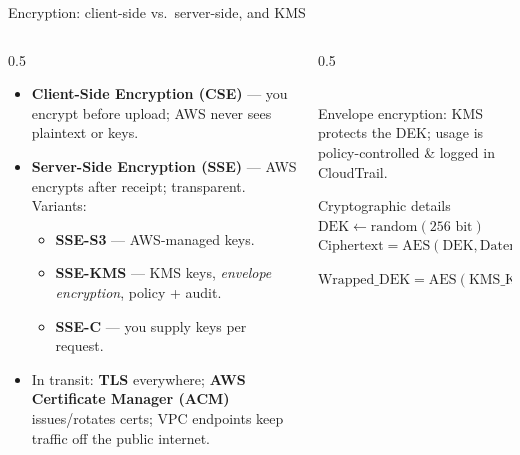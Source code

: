 \documentclass[aspectratio=169,10pt]{beamer}
\newcommand{\svc}[1]{{\color{accent}\textsf{\textbf{#1}}}}      %
\newcommand{\term}[1]{{\color{awsink}\textbf{#1}}}
\begin{document}
\begin{frame}{Encryption: client-side vs.\ server-side, and KMS}
  \begin{columns}[T]
    \begin{column}{0.5\textwidth}\small
      \begin{itemize}
        \item \term{Client-Side Encryption (CSE)} --- you encrypt before upload; AWS never sees plaintext or keys.
        \item \term{Server-Side Encryption (SSE)} --- AWS encrypts after receipt; transparent. Variants:
          \begin{itemize}
            \item \term{SSE-S3} --- AWS-managed keys.
            \item \term{SSE-KMS} --- KMS keys, \emph{envelope encryption}, policy + audit.
            \item \term{SSE-C} --- you supply keys per request.
          \end{itemize}
        \item In transit: \term{TLS} everywhere; \svc{AWS Certificate Manager (ACM)} issues/rotates certs; VPC endpoints
              keep traffic off the public internet.
      \end{itemize}
    \end{column}
    \begin{column}{0.5\textwidth}
      \centering
      \\[0.3em]
      {\scriptsize Envelope encryption: KMS protects the DEK; usage is policy-controlled \& logged in CloudTrail.}
    \begin{block}{Cryptographic details}
      $\text{DEK} \leftarrow \text{random}(256 \text{ bit})$ 
    $\text{Ciphertext} = \text{AES}(\text{DEK}, \text{Daten})$ 

    $\text{Wrapped\_DEK} = \text{AES}(\text{KMS\_Key}, \text{DEK})$ 
    \end{block}
      
    \end{column}
    
      
    

  \end{columns}
\end{frame}
\end{document}
